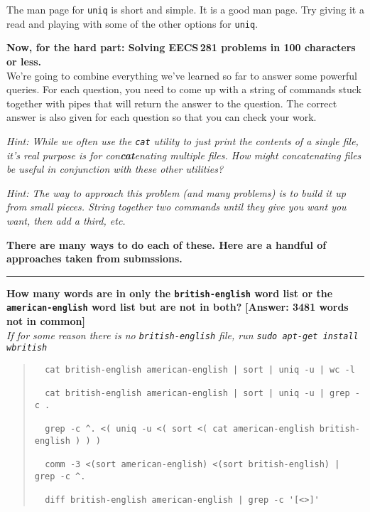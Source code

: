 \documentclass{article}
\begin{document}
\medskip
\noindent
The man page for \texttt{uniq} is short and simple. It is a good man page. Try
giving it a read and playing with some of the other options for \texttt{uniq}.


\newpage
\medskip
\noindent
\textbf{\large Now, for the hard part: Solving EECS\,281 problems in 100 characters or less.}\\
We're going to combine everything we've learned so far to answer some powerful
queries. For each question, you need to come up with a string of commands
stuck together with pipes that will return the answer to the question. The
correct answer is also given for each question so that you can check your
work.

\medskip
\noindent
\emph{\small Hint: While we often use the \texttt{cat} utility to just print
  the contents of a single file, it's real purpose is for con\textbf{cat}enating
  multiple files. How might concatenating files be useful in conjunction with
  these other utilities?
}

\medskip
\noindent
\emph{\small Hint: The way to approach this problem (and many problems) is to
  build it up from small pieces. String together two commands until they give
  you want you want, then add a third, etc.
}

\medskip
\noindent
{
  \color{violet}\bf
  There are many ways to do each of these. Here are a handful of approaches
  taken from submssions.
}


\bigskip
\hrule
\smallskip
\noindent
\textbf{How many words are in only the \texttt{british-english} word list or
the \texttt{american-english} word list but are not in both?}
\hfill \textbf{[Answer: 3481 words not in common]}\\
\emph{\small If for some reason there is no \texttt{british-english} file, run
\texttt{sudo apt-get install wbritish}}

\begin{quote}
  \color{violet}
  \begin{lstlisting}
  cat british-english american-english | sort | uniq -u | wc -l

  cat british-english american-english | sort | uniq -u | grep -c .

  grep -c ^. <( uniq -u <( sort <( cat american-english british-english ) ) )

  comm -3 <(sort american-english) <(sort british-english) | grep -c ^.

  diff british-english american-english | grep -c '[<>]'
  \end{lstlisting}
\end{quote}
\end{document}
